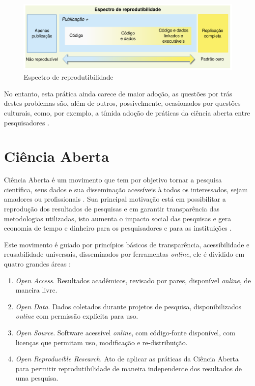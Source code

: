 \begin{figure}[h]
  \center
  \includegraphics[scale=0.3]{imagens/reproducibility-spectrum-ptbr.png}
  \caption{Espectro de reprodutibilidade \cite{peng2011reproducible}}
  \label{reproducibility-spectrum}
\end{figure}

No entanto, esta prática ainda carece de maior adoção, as questões por trás
destes problemas são, além de outros, possivelmente, ocasionados por questões
culturais, como, por exemplo, a tímida adoção de práticas da ciência aberta
entre pesquisadores \cite{niemeyer2017open}.

\section{Ciência Aberta}
\label{sec:ciencia-aberta}

Ciência Aberta é um movimento que tem por objetivo tornar a pesquisa
científica, seus dados e sua disseminação acessíveis à todos os interessados,
sejam amadores ou profissionais \cite{WikipediaOpenScience}. Sua principal
motivação está em possibilitar a reprodução dos resultados de pesquisas e em
garantir transparência das metodologias utilizadas, isto aumenta o impacto
social das pesquisas e gera economia de tempo e dinheiro para os pesquisadores
e para as instituições \cite{nesta2010open}.

Este movimento é guiado por princípios básicos de transparência, acessibilidade
e reusabilidade universais, disseminados por ferramentas {\it online}, ele é
dividido em quatro grandes áreas \cite{pontika_fostering_2015}:

\begin{enumerate}
  \item {\it Open Access}.
    Resultados acadêmicos, revisado por pares, disponível {\it online}, de
    maneira livre.

  \item {\it Open Data}.
    Dados coletados durante projetos de pesquisa, disponibilizados {\it
    online} com permissão explícita para uso.

  \item {\it Open Source}.
    Software acessível {\it online}, com código-fonte disponível, com licenças
    que permitam uso, modificação e re-distribuição.

  \item {\it Open Reproducible Research}.
    Ato de aplicar as práticas da Ciência Aberta para permitir reprodutibilidade
    de maneira independente dos resultados de uma pesquisa.
\end{enumerate}

